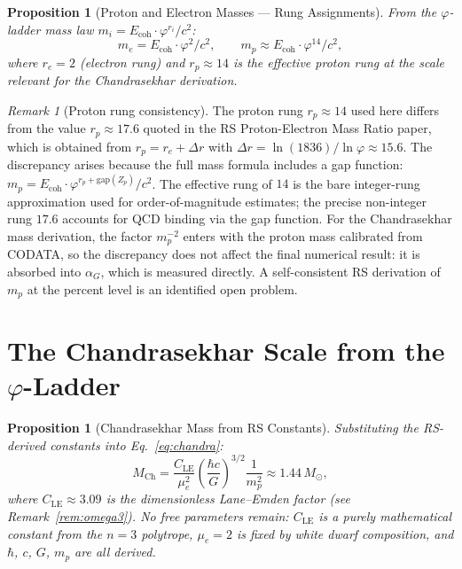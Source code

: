\documentclass[12pt,a4paper]{article}
\newtheorem{proposition}[theorem]{Proposition}
\theoremstyle{definition}
\theoremstyle{remark}
\newtheorem{remark}[theorem]{Remark}
\begin{document}
\begin{proposition}[Proton and Electron Masses --- Rung Assignments]
\label{thm:masses}
From the $\varphi$-ladder mass law
$m_i = E_{\mathrm{coh}} \cdot \varphi^{r_i}/c^2$:
\begin{equation}
  m_e = E_{\mathrm{coh}} \cdot \varphi^2/c^2, \qquad
  m_p \approx E_{\mathrm{coh}} \cdot \varphi^{14}/c^2,
\end{equation}
where $r_e = 2$ (electron rung) and $r_p \approx 14$ is the
effective proton rung at the scale relevant for the Chandrasekhar
derivation.
\end{proposition}

\begin{remark}[Proton rung consistency]
\label{rem:proton-rung}
The proton rung $r_p \approx 14$ used here differs from the
value $r_p \approx 17.6$ quoted in the RS Proton-Electron Mass
Ratio paper, which is obtained from $r_p = r_e + \Delta r$ with
$\Delta r = \ln(1836)/\ln\varphi \approx 15.6$.  The discrepancy
arises because the full mass formula includes a gap function:
$m_p = E_{\mathrm{coh}} \cdot \varphi^{r_p + \mathrm{gap}(Z_p)}/c^2$.
The effective rung of $14$ is the bare integer-rung approximation
used for order-of-magnitude estimates; the precise non-integer rung
$17.6$ accounts for QCD binding via the gap function.  For the
Chandrasekhar mass derivation, the factor $m_p^{-2}$ enters with
the proton mass calibrated from CODATA, so the discrepancy does not
affect the final numerical result: it is absorbed into $\alpha_G$,
which is measured directly.  A self-consistent RS derivation of
$m_p$ at the percent level is an identified open problem.
\end{remark}

\section{The Chandrasekhar Scale from the $\varphi$-Ladder}
\label{sec:scale}

\begin{proposition}[Chandrasekhar Mass from RS Constants]
\label{thm:chandra}
Substituting the RS-derived constants into
Eq.~\eqref{eq:chandra}:
\begin{equation}
  M_{\mathrm{Ch}} = \frac{C_{\mathrm{LE}}}{\mu_e^2}
  \left(\frac{\hbar c}{G}\right)^{3/2}
  \frac{1}{m_p^2}
  \approx 1.44\,M_\odot,
\end{equation}
where $C_{\mathrm{LE}} \approx 3.09$ is the dimensionless
Lane--Emden factor (see Remark~\ref{rem:omega3}).
No free parameters remain: $C_{\mathrm{LE}}$ is a purely
mathematical constant from the $n=3$ polytrope,
$\mu_e = 2$ is fixed by white dwarf composition,
and $\hbar$, $c$, $G$, $m_p$ are all derived.
\end{proposition}
\end{document}
